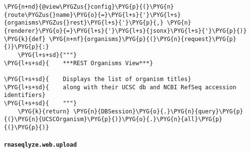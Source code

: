 \begin{Verbatim}[commandchars=\\\{\}]
\PYG{n+nd}{@view\PYGZus{}config}\PYG{p}{(}\PYG{n}{route\PYGZus{}name}\PYG{o}{=}\PYG{l+s}{'}\PYG{l+s}{organisms\PYGZus{}rest}\PYG{l+s}{'}\PYG{p}{,} \PYG{n}{renderer}\PYG{o}{=}\PYG{l+s}{'}\PYG{l+s}{jsonx}\PYG{l+s}{'}\PYG{p}{)}
\PYG{k}{def} \PYG{n+nf}{organisms}\PYG{p}{(}\PYG{n}{request}\PYG{p}{)}\PYG{p}{:}
    \PYG{l+s+sd}{"""}
\PYG{l+s+sd}{    ***REST Organisms View***}

\PYG{l+s+sd}{    Displays the list of organism titles}
\PYG{l+s+sd}{    along with their UCSC db and NCBI RefSeq accession identifiers}
\PYG{l+s+sd}{    """}
    \PYG{k}{return} \PYG{n}{DBSession}\PYG{o}{.}\PYG{n}{query}\PYG{p}{(}\PYG{n}{UCSCOrganism}\PYG{p}{)}\PYG{o}{.}\PYG{n}{all}\PYG{p}{(}\PYG{p}{)}
\end{Verbatim}


\paragraph{\texttt{rnaseqlyze.web.upload}}
\label{index-pdf4:rnaseqlyze-web-upload}
